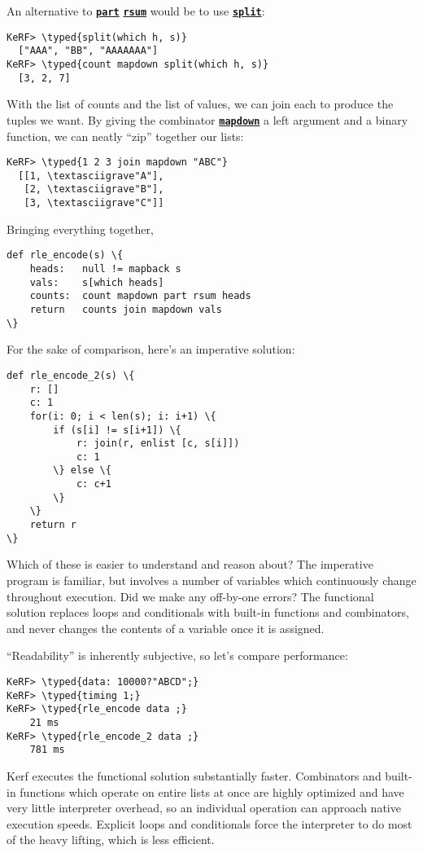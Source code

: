 \documentclass{article}
\newcommand{\typed}[1]{\textcolor{TealBlue}{#1}}
\newcommand{\primu}[2]{\hyperref[prim:#2]{\textbf{\texttt{#1}}}}
\newcommand{\prim}[1]{\primu{#1}{#1}}
\newcommand{\comb}[1]{\primu{#1}{#1}}
\begin{document}
An alternative to \prim{part} \prim{rsum} would be to use \prim{split}:
\begin{Verbatim}
KeRF> \typed{split(which h, s)}
  ["AAA", "BB", "AAAAAAA"]
KeRF> \typed{count mapdown split(which h, s)}
  [3, 2, 7]
\end{Verbatim}

With the list of counts and the list of values, we can join each to produce the tuples we want. By giving the combinator \comb{mapdown} a left argument and a binary function, we can neatly ``zip'' together our lists:
\begin{Verbatim}
KeRF> \typed{1 2 3 join mapdown "ABC"}
  [[1, \textasciigrave"A"],
   [2, \textasciigrave"B"], 
   [3, \textasciigrave"C"]]
\end{Verbatim}

\pagebreak
Bringing everything together,
\begin{Verbatim}
def rle_encode(s) \{
	heads:   null != mapback s
	vals:    s[which heads]
	counts:  count mapdown part rsum heads
	return   counts join mapdown vals
\}
\end{Verbatim}

For the sake of comparison, here's an imperative solution:
\begin{Verbatim}
def rle_encode_2(s) \{
	r: []
	c: 1
	for(i: 0; i < len(s); i: i+1) \{
		if (s[i] != s[i+1]) \{
			r: join(r, enlist [c, s[i]])
			c: 1
		\} else \{
			c: c+1
		\}
	\}
	return r
\}
\end{Verbatim}

Which of these is easier to understand and reason about? The imperative program is familiar, but involves a number of variables which continuously change throughout execution. Did we make any off-by-one errors? The functional solution replaces loops and conditionals with built-in functions and combinators, and never changes the contents of a variable once it is assigned.

\vspace{0.5cm}

``Readability'' is inherently subjective, so let's compare performance:
\begin{Verbatim}
KeRF> \typed{data: 10000?"ABCD";}
KeRF> \typed{timing 1;}
KeRF> \typed{rle_encode data ;}
    21 ms
KeRF> \typed{rle_encode_2 data ;}
    781 ms
\end{Verbatim}
Kerf executes the functional solution substantially faster. Combinators and built-in functions which operate on entire lists at once are highly optimized and have very little interpreter overhead, so an individual operation can approach native execution speeds. Explicit loops and conditionals force the interpreter to do most of the heavy lifting, which is less efficient.
\end{document}
